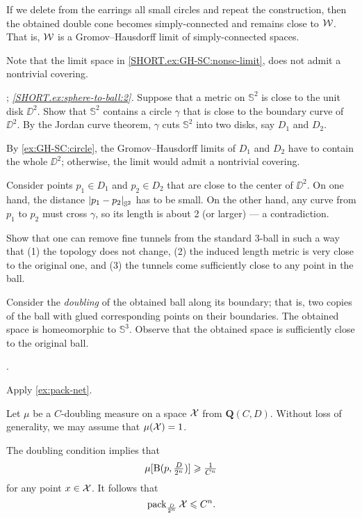If we delete from the earrings all small circles and repeat the construction,
then the obtained double cone becomes simply-connected and remains close to $\mathcal{W}$.
That is, $\mathcal{W}$ is a Gromov--Hausdorff limit of simply-connected spaces.

Note that the limit space in \ref{SHORT.ex:GH-SC:nonsc-limit}, does not admit a nontrivial covering.

\parbf{\ref{ex:sphere-to-ball}};
\textit{\ref{SHORT.ex:sphere-to-ball:2}.}
Suppose that a metric on $\mathbb{S}^2$ is close to the unit disk $\DD^2$.
Show that $\mathbb{S}^2$ contains a circle $\gamma$ that is close to the boundary curve of $\DD^2$.
By the Jordan curve theorem, $\gamma$ cuts $\mathbb{S}^2$ into two disks, say $D_1$ and $D_2$.

By \ref{ex:GH-SC:circle}, the Gromov--Hausdorff limits of $D_1$ and $D_2$ have to contain the whole $\DD^2$; otherwise, the limit would admit a nontrivial covering.

Consider points $p_1\in D_1$ and $p_2\in D_2$ that are close to the center of $\DD^2$.
On one hand, the distance $\dist{p_1}{p_2}{\mathbb{S}^2}$ has to be small.
On the other hand, any curve from $p_1$ to $p_2$ must cross $\gamma$, so its length is about 2 (or larger) --- a contradiction.

Show that one can remove fine tunnels from the standard 3-ball in such a way that (1) the topology does not change, (2) the induced length metric is very close to the original one, and (3) the tunnels come sufficiently close to any point in the ball.

Consider the \emph{doubling} of the obtained ball along its boundary;
that is, two copies of the ball with glued corresponding points on their boundaries.
The obtained space is homeomorphic to $\mathbb{S}^3$.
Observe that the obtained space is sufficiently close to the original ball.

 \cite[Exercises 7.5.13 and 7.5.17]{burago-burago-ivanov}. 

 Apply \ref{ex:pack-net}.

Let $\mu$ be a $C$-doubling measure on a space $\mathcal{X}$ from $\bm{Q}(C,D)$.
Without loss of generality, we may assume that $\mu(\spc{X})\z=1$.

The doubling condition implies that 
\[\mu[\mathrm{B}{}(p,\tfrac D{2^n})]\geqslant\tfrac 1{C^n}\]
for any point $x\in \mathcal{X}$.
It follows that 
\[\operatorname{\rm pack}\nolimits_{\frac D{2^n}}\mathcal{X}\leqslant C^n.\]

